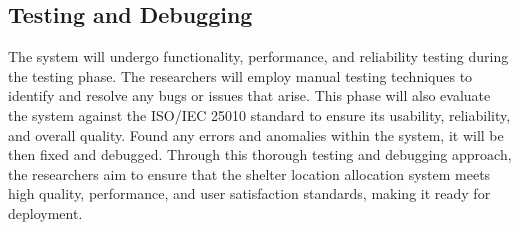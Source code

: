 	\begin{table}[h]
		\centering
		\caption{List of libraries installed in Python}
		\label{PythonUsed}
	\end{table}
	
	
	
\subsection{Testing and Debugging}
	The system will undergo functionality, performance, and reliability testing during the testing phase. The researchers will employ manual testing techniques to identify and resolve any bugs or issues that arise. This phase will also evaluate the system against the ISO/IEC 25010 standard to ensure its usability, reliability, and overall quality. Found any errors and anomalies within the system, it will be then fixed and debugged. Through this thorough testing and debugging approach, the researchers aim to ensure that the shelter location allocation system meets high quality, performance, and user satisfaction standards, making it ready for deployment.
	

